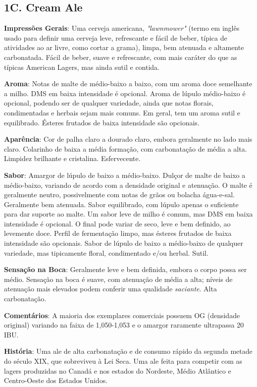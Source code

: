 \subsection*{1C. Cream Ale}
\textbf{Impressões Gerais}: Uma cerveja americana, \textit{"lawnmower"} (termo em inglês usado para definir uma cerveja leve, refrescante e fácil de beber, típica de atividades ao ar livre, como cortar a grama), limpa, bem atenuada e altamente carbonatada. Fácil de beber, suave e refrescante, com mais caráter do que as típicas American Lagers, mas ainda sutil e contida.

\textbf{Aroma}: Notas de malte de médio-baixo a baixo, com um aroma doce semelhante a milho. DMS em baixa intensidade é opcional. Aroma de lúpulo médio-baixo é opcional, podendo ser de qualquer variedade, ainda que notas florais, condimentadas e herbais sejam mais comuns. Em geral, tem um aroma sutil e equilibrado. Ésteres frutados de baixa intensidade são opcionais.

\textbf{Aparência}: Cor de palha claro a dourado claro, embora geralmente no lado mais claro. Colarinho de baixa a média formação, com carbonatação de média a alta. Limpidez brilhante e cristalina. Esfervecente.

\textbf{Sabor}: Amargor de lúpulo de baixo a médio-baixo. Dulçor de malte de baixo a médio-baixo, variando de acordo com a densidade original e atenuação. O malte é geralmente neutro, possivelmente com notas de grãos ou bolacha água-e-sal. Geralmente bem atenuada. Sabor equilibrado, com lúpulo apenas o suficiente para dar suporte ao malte. Um sabor leve de milho é comum, mas DMS em baixa intensidade é opcional. O final pode variar de seco, leve e bem definido, ao levemente doce. Perfil de fermentação limpo, mas ésteres frutados de baixa intensidade são opcionais. Sabor de lúpulo de baixo a médio-baixo de qualquer variedade, mas tipicamente floral, condimentado e/ou herbal. Sutil.

\textbf{Sensação na Boca}: Geralmente leve e bem definida, embora o corpo possa ser médio. Sensação na boca é suave, com atenuação de média a alta; níveis de atenuação mais elevados podem conferir uma qualidade \textit{saciante}. Alta carbonatação.

\textbf{Comentários}: A maioria dos exemplares comerciais possuem OG (densidade original) variando na faixa de 1,050-1,053 e o amargor raramente ultrapassa 20 IBU.

\textbf{História}: Uma ale de alta carbonatação e de consumo rápido da segunda metade do século XIX, que sobreviveu à Lei Seca. Uma ale feita para competir com as lagers produzidas no Canadá e nos estados do Nordeste, Médio Atlântico e Centro-Oeste dos Estados Unidos.

